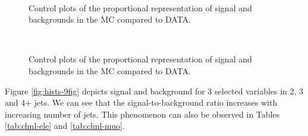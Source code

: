 \begin{figure}[thb]
  \centering
  \\
  \caption{Control plots of the proportional representation of signal and backgrounds in the MC compared to DATA.}
  \label{fig:contrPlots1}
\end{figure} 

\begin{figure}[thb]
  \centering
  \\
  \caption{Control plots of the proportional representation of signal and backgrounds in the MC compared to DATA.}
  \label{fig:contrPlots2}
\end{figure} 

Figure \ref{fig:hists-9fig} depicts signal and background for 3 selected variables in 2, 3 and 4+ jets. We can see that the signal-to-background ratio increases with increasing number of jets. This phenomenon  can also be observed in Tables \ref{tab:chnl-ele} and \ref{tab:chnl-muo}. 
